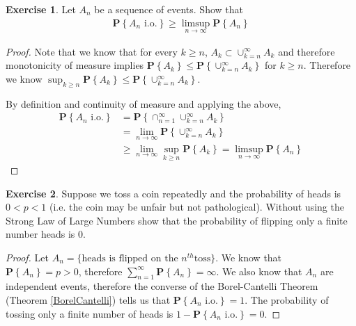 \documentclass{amsbook}
\theoremstyle{definition}
\newtheorem{xca}{Exercise}
\theoremstyle{remark}
\newcommand{\probability}[1]{\textbf{P}\left \{#1 \right \}}
\begin{document}
\begin{xca}Let $A_n$ be a sequence of events. Show that 
\begin{align*}
\probability{A_n \text{ i.o.}} \geq \limsup_{n \to \infty} \probability{A_n}
\end{align*}
\end{xca}
\begin{proof}
Note that we know that for every $k\geq n$, $A_k \subset
\cup_{k=n}^\infty A_k$ and therefore monotonicity of measure implies $\probability{A_k} \leq
\probability{\cup_{k=n}^\infty A_k}$ for $k\geq n$.  Therefore we know
$\sup_{k\geq n} \probability{A_k} \leq
\probability{\cup_{k=n}^\infty A_k}$.

By definition and continuity of measure and applying the above,
\begin{align*}
\probability{A_n \text{ i.o.}} &= \probability{\cap_{n=1}^\infty
  \cup_{k=n}^\infty A_k} \\
&= \lim_{n \to \infty} \probability{\cup_{k=n}^\infty A_k} \\
&\geq \lim_{n \to \infty} \sup_{k \geq n} \probability{ A_k} =
\limsup_{n \to \infty} \probability{ A_n} 
\end{align*}
\end{proof}

\begin{xca}Suppose we toss a coin repeatedly and the probability of
  heads is $0 < p < 1$ (i.e. the coin may be unfair but not
  pathological).  Without using the Strong Law of Large Numbers show
  that the probability of flipping only a finite number heads is $0$.
\end{xca}
\begin{proof}
Let $A_n = \lbrace \text{heads is flipped on the }n^{th}\text{
  toss}\rbrace$.  We know that $\probability{A_n} = p >0$, therefore
$\sum_{n=1}^\infty \probability{A_n} = \infty$.  We also know that
$A_n$ are independent events, therefore the converse of the
Borel-Cantelli Theorem (Theorem \ref{BorelCantelli}) tells us that $\probability{ A_n \text{ i.o.}}
= 1$.  The probability of tossing only a finite number of
heads is $1 - \probability{ A_n \text{ i.o.}} = 0$.
\end{proof}
\end{document}
